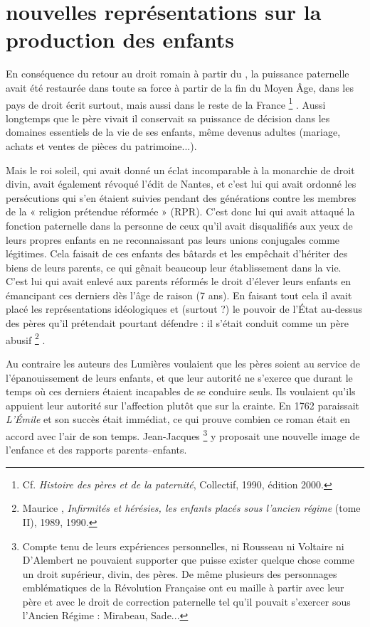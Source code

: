 \section{nouvelles représentations sur la production des enfants}

 En conséquence du retour au droit romain à partir du , la puissance paternelle avait été restaurée dans toute sa force à partir de la fin du Moyen Âge, dans les pays de droit écrit surtout, mais aussi dans le reste de la France%
\footnote{Cf. \emph{Histoire des pères et de la paternité}, Collectif, 1990, édition 2000.}%
. Aussi longtemps que le père vivait il conservait sa puissance de décision dans les domaines essentiels de la vie de ses enfants, même devenus adultes (mariage, achats et ventes de pièces du patrimoine...). 

 Mais le roi soleil, qui avait donné un éclat incomparable à la monarchie de droit divin, avait également révoqué l'édit de Nantes, et c'est lui qui avait ordonné les persécutions qui s'en étaient suivies pendant des générations contre les membres de la « {religion prétendue réformée} » (RPR). C'est donc lui qui avait attaqué la fonction paternelle dans la personne de ceux qu'il avait disqualifiés aux yeux de leurs propres enfants en ne reconnaissant pas leurs unions conjugales comme légitimes. Cela faisait de ces enfants des bâtards et les empêchait d'hériter des biens de leurs parents, ce qui gênait beaucoup leur établissement dans la vie. C'est lui qui avait enlevé aux parents réformés le droit d'élever leurs enfants en émancipant ces derniers dès l'âge de raison (7 ans). En faisant tout cela il avait placé les représentations idéologiques et (surtout ?) le pouvoir de l'État au-dessus des pères qu'il prétendait pourtant défendre : il s'était conduit comme un père abusif%
\footnote{Maurice , \emph{Infirmités et hérésies, les enfants placés sous l'ancien régime} (tome II), 1989, 1990.}%
.


 Au contraire les auteurs des Lumières voulaient que les pères soient au service de l'épanouissement de leurs enfants, et que leur autorité ne s'exerce que durant le temps où ces derniers étaient incapables de se conduire seuls. Ils voulaient qu'ils appuient leur autorité sur l'affection plutôt que sur la crainte. En 1762 paraissait \emph{L'Émile} et son succès était immédiat, ce qui prouve combien ce roman était en accord avec l'air de son temps. Jean-Jacques %
\footnote{Compte tenu de leurs expériences personnelles, ni Rousseau ni Voltaire ni D'Alembert ne pouvaient supporter que puisse exister quelque chose comme un droit supérieur, divin, des pères. De même plusieurs des personnages emblématiques de la Révolution Française ont eu maille à partir avec leur père et avec le droit de correction paternelle tel qu'il pouvait s'exercer sous l'Ancien Régime : Mirabeau, Sade...} 
y proposait une nouvelle image de l'enfance et des rapports parents--enfants. 

